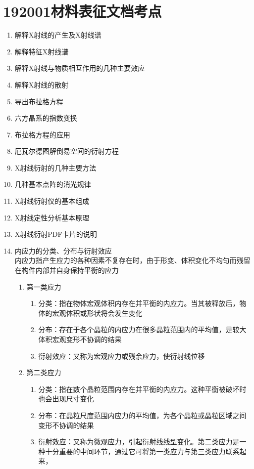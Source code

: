 \documentclass[12pt,a4paper]{article}
\begin{document}
    \section{192001材料表征文档考点}
    \begin{enumerate}
        \item 解释X射线的产生及X射线谱
        \item 解释特征X射线谱
        \item 解释X射线与物质相互作用的几种主要效应
        \item 解释X射线的散射
        \item 导出布拉格方程
        \item 六方晶系的指数变换
        \item 布拉格方程的应用
        \item 厄瓦尔德图解倒易空间的衍射方程
        \item X射线衍射的几种主要方法
        \item 几种基本点阵的消光规律
        \item X射线衍射仪的基本组成
        \item X射线定性分析基本原理
        \item X射线衍射PDF卡片的说明
        \item 内应力的分类、分布与衍射效应
        \\内应力指产生应力的各种因素不复存在时，由于形变、体积变化不均匀而残留在构件内部并自身保持平衡的应力
        \begin{enumerate}
            \item 第一类应力
            \begin{enumerate}
                \item 分类：指在物体宏观体积内存在并平衡的内应力。当其被释放后，物体的宏观体积或形状将会发生变化
                \item 分布：存在于各个晶粒的内应力在很多晶粒范围内的平均值，是较大体积宏观变形不协调的结果
                \item 衍射效应：又称为宏观应力或残余应力，使衍射线位移
            \end{enumerate}
            \item 第二类应力
            \begin{enumerate}
                \item 分类：指在数个晶粒范围内存在并平衡的内应力。这种平衡被破坏时也会出现尺寸变化
                \item 分布：在晶粒尺度范围内应力的平均值，为各个晶粒或晶粒区域之间变形不协调的结果
                \item 衍射效应：又称为微观应力，引起衍射线线型变化。第二类应力是一种十分重要的中间环节，通过它可将第一类应力与第三类应力联系起来，

\end{enumerate}
\end{enumerate}
\end{enumerate}
\end{document}
